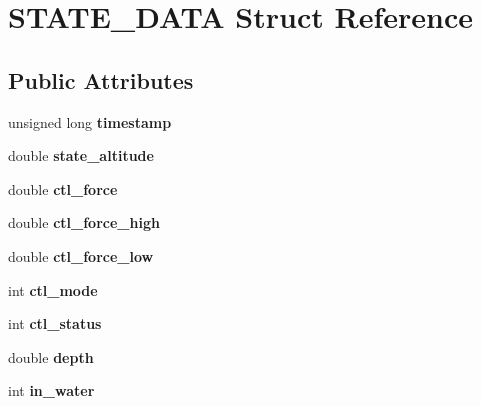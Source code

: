 \hypertarget{structSTATE__DATA}{}\section{S\+T\+A\+T\+E\+\_\+\+D\+A\+TA Struct Reference}
\label{structSTATE__DATA}
\subsection*{Public Attributes}
\begin{DoxyCompactItemize}
\item 
\mbox{\label{structSTATE__DATA_a1d35b9f23b6aedabf05ef98cd83cfc48}} 
unsigned long {\bfseries timestamp}
\item 
\mbox{\label{structSTATE__DATA_ab5a9a89aae3c297116a8d4a1b26d3958}} 
double {\bfseries state\+\_\+altitude}
\item 
\mbox{\label{structSTATE__DATA_ada276e1b3532a0b31278d5b9e75206ee}} 
double {\bfseries ctl\+\_\+force}
\item 
\mbox{\label{structSTATE__DATA_ad10f85de39bc72857250cae254d67b61}} 
double {\bfseries ctl\+\_\+force\+\_\+high}
\item 
\mbox{\label{structSTATE__DATA_a39129c1d0bbe756570fe5b1ed9ff1f0c}} 
double {\bfseries ctl\+\_\+force\+\_\+low}
\item 
\mbox{\label{structSTATE__DATA_a4d46704f03ceb994b9598e2de2801b71}} 
int {\bfseries ctl\+\_\+mode}
\item 
\mbox{\label{structSTATE__DATA_acf582d791e1c616d81f216244fcb4c2b}} 
int {\bfseries ctl\+\_\+status}
\item 
\mbox{\label{structSTATE__DATA_a5ef65f9e38624250e0cbf56aece8365e}} 
double {\bfseries depth}
\item 
\mbox{\label{structSTATE__DATA_a2d09a4cf22ca530a41cfccb988063f88}} 
int {\bfseries in\+\_\+water}
\item 
\mbox{\label{structSTATE__DATA_ad9df66f6695a691afb338b61aa093eab}} 

\end{DoxyCompactItemize}
